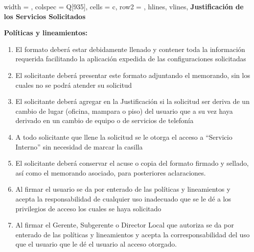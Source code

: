 \documentclass[letterpaper,11pt]{article}
\begin{document}
\vspace{-25pt}
\begin{longtblr}[
	label = none,
	entry = none,
	]{
		width = \linewidth,
		colspec = {Q[935]},
		cells = {c},
		row{2} = {},
		hlines,
		vlines,
	}
	\textbf{Justificación de los Servicios Solicitados} \\\JUSTIFICACION
\end{longtblr}
\clearpage
\textbf{\small Políticas y lineamientos:}
{  \small\begin{enumerate}
\item El formato deberá estar debidamente llenado y contener toda la información requerida facilitando la aplicación expedida de las configuraciones solicitadas
\item El solicitante deberá presentar este formato adjuntando el memorando, sin los cuales no se podrá atender su solicitud
\item El solicitante deberá agregar en la Justificación si la solicitud ser deriva de un cambio de lugar (oficina, mampara o piso) del usuario que a su vez haya derivado en un cambio de equipo o de servicios de telefonía
\item A todo solicitante que llene la solicitud se le otorga el acceso a “Servicio Interno” sin necesidad de marcar la casilla
\item El solicitante deberá conservar el acuse o copia del formato firmado y sellado, así como el memorando asociado, para posteriores aclaraciones. 
\item Al firmar el usuario se da por enterado de las políticas y lineamientos y acepta la responsabilidad de cualquier uso inadecuado que se le dé a los privilegios de acceso los cuales se haya solicitado
\item Al firmar el Gerente, Subgerente o Director Local que autoriza se da por enterado de las políticas y lineamientos y acepta la corresponsabilidad del uso que el usuario que le dé el usuario al acceso otorgado.

\end{enumerate}}
\vspace{250pt}
\end{document}
